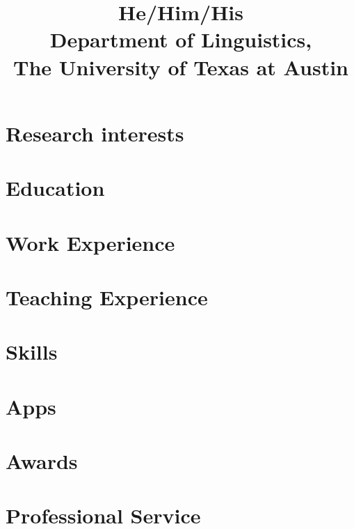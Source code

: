 \documentclass{practical-cv}
\title{He/Him/His\\Department of Linguistics,\\The University of Texas at Austin}
\begin{document}
\makecvtitle

\section{Research interests}


\section{Education}


\section{Work Experience}


\printbibliography[title=Publications, nottype=talk]

\printbibliography[title=Talks, type=talk]

\section{Teaching Experience}


\section{Skills}


\section{Apps}


\section{Awards}


\section{Professional Service}

\end{document}
